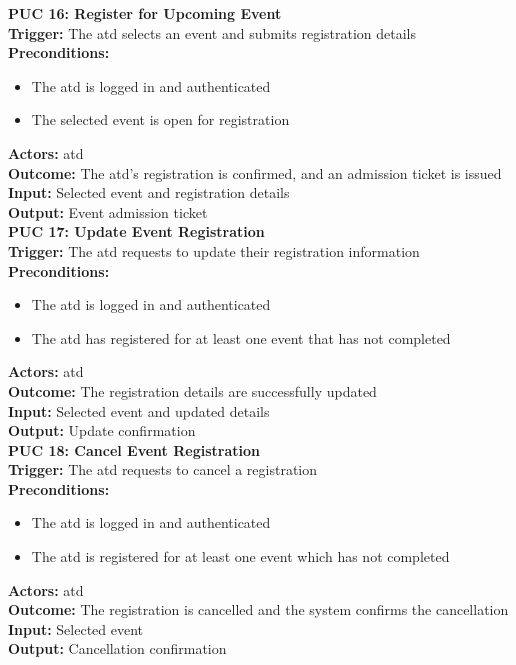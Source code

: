 \documentclass[12pt]{article}
\begin{document}
{\textbf{PUC 16: Register for Upcoming Event} \\
\textbf{Trigger:} The \gls{atd} selects an event and submits registration details \\
\textbf{Preconditions:}
\begin{itemize}
  \item The \gls{atd} is logged in and authenticated
  \item The selected event is open for registration
\end{itemize}
\textbf{Actors:} \Gls{atd} \\
\textbf{Outcome:} The \gls{atd}’s registration is confirmed, and an admission ticket is issued \\
\textbf{Input:} Selected event and registration details \\
\textbf{Output:} Event admission ticket \\[1em]

\textbf{PUC 17: Update Event Registration} \\
\textbf{Trigger:} The \gls{atd} requests to update their registration information \\
\textbf{Preconditions:}
\begin{itemize}
  \item The \gls{atd} is logged in and authenticated
  \item The \gls{atd} has registered for at least one event that has not completed
\end{itemize}
\textbf{Actors:} \Gls{atd} \\
\textbf{Outcome:} The registration details are successfully updated \\
\textbf{Input:} Selected event and updated details \\
\textbf{Output:} Update confirmation \\[1em]

\textbf{PUC 18: Cancel Event Registration} \\
\textbf{Trigger:} The \gls{atd} requests to cancel a registration \\
\textbf{Preconditions:}
\begin{itemize}
  \item The \gls{atd} is logged in and authenticated
  \item The \gls{atd} is registered for at least one event which has not completed
\end{itemize}
\textbf{Actors:} \Gls{atd} \\
\textbf{Outcome:} The registration is cancelled and the system confirms the cancellation \\
\textbf{Input:} Selected event \\
\textbf{Output:} Cancellation confirmation \\[1em]

}
\end{document}
